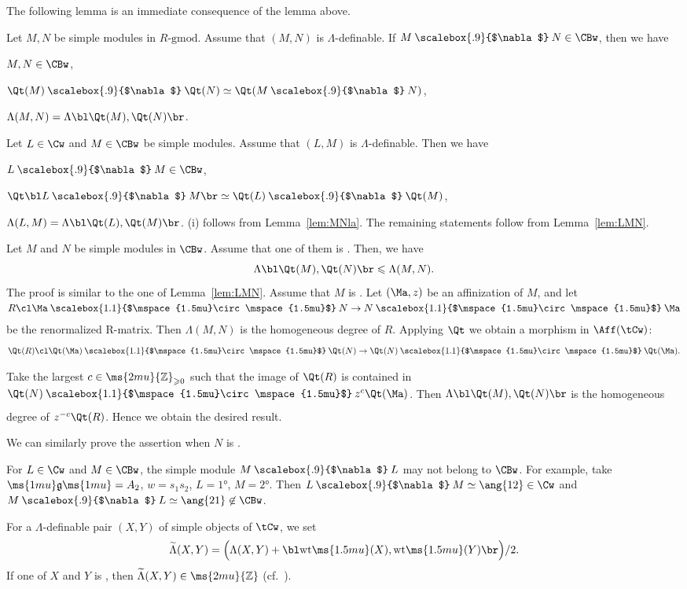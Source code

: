 \documentclass[12pt,leqno]{amsart}%
\renewcommand{\le}{\leqslant}
\renewcommand{\ge}{\geqslant}
\theoremstyle{plain}
\theoremstyle{definition}
\newcommand{\Z}{\ms{2mu}{\mathbb Z}}
\newcommand{\g}{\ms{1mu}\mathfrak{g}\ms{1mu}}
\newcommand{\gmod}{\text{-}\mathrm{gmod}}
\newcommand{\conv}[1][]{
\underset{\raisebox{.5ex}{$\scriptstyle{#1}$}}{\mathbin{\scalebox{1.1}{$\mspace{1.5mu}\circ\mspace{1.5mu}$}}}}
\newcommand{\hconv}{\mathbin{\scalebox{.9}{$\nabla$}}}
\newcommand{\wt}{\mathrm{wt}\ms{1.5mu}} 		%
\newcommand{\La}{\Lambda} 			%
\newcommand{\tLa}{\widetilde{\Lambda}} 			%
\newcommand{\bnum}{\be[{\rm(i)}]}
\numberwithin{equation}{section}
\begin{document}
The following lemma is an immediate consequence of the lemma above.

\Lemma\label{lem:LMN}
Let $M,N$ be simple modules in $R\gmod$. Assume that $(M,N)$ is $\La$-definable.
If $M\hconv N\in\CBw$, then we have
\bnum
\item $M,N\in\CBw$,
\item$\Qt(M)\hconv\Qt(N)\simeq \Qt(M\hconv N)$,
\item
$\La(M,N)=\La\bl\Qt(M),\Qt(N)\br$.
\ee
\enlemma

%
\Prop\label{prop:CB}
Let $L\in\Cw$ and $M\in\CBw$ be simple modules.
Assume that  $(L,M)$ is $\La$-definable.
Then we have
\bnum
\item $L\hconv M\in\CBw$,
\item $\Qt\bl L\hconv M\br \simeq \Qt(L)\hconv \Qt(M)$,
\item $\La(L,M)=\La\bl \Qt(L), \Qt(M)\br$.
\ee
\enprop
\Proof
(i) follows from Lemma~\ref{lem:MNla}.
The remaining statements follow from Lemma~\ref{lem:LMN}.
\QED

\Lemma\label{lem:LaQt}
Let $M$ and $N$ be simple modules in $\CBw$.
Assume that one of them is \afr. Then, we have
$$\La\bl\Qt(M),\Qt(N)\br\le\La(M,N).$$
\enlemma
\Proof
The proof is similar to the one of Lemma~\ref{lem:LMN}.
Assume that $M$ is \afr.
Let $(\Ma,z)$ be an affinization of $M$, and let
$R\cl \Ma\conv N\to N\conv \Ma$
be the renormalized R-matrix.
Then $\La(M,N)$ is the homogeneous degree of $R$.
Applying $\Qt$ we obtain a morphism in $\Aff(\tCw)$:
$$\Qt(R)\cl \Qt(\Ma)\conv \Qt(N)\to \Qt(N)\conv \Qt(\Ma).$$
Take the largest $c\in\Z_{\ge0}$ such that
the image of $\Qt(R)$ is contained in $\Qt(N)\conv z^c\Qt(\Ma)$.
Then $\La\bl\Qt(M),\Qt(N)\br$ is the homogeneous degree of $z^{-c}\Qt(R)$.
Hence we obtain the desired result.

We can similarly prove the assertion when $N$ is \afr.
\QED

\Rem\label{rem:12}
For \afr $L\in\Cw$ and $M\in\CBw$, the simple module $M\hconv L$ may not belong to $\CBw$.
For example, take $\g=A_2$, $w=s_1s_2$,
$L=\ang{1}$, $M=\ang{2}$.
Then $L\hconv M\simeq\ang{12}\in\Cw$ and
$M\hconv L\simeq\ang{21}\not\in\CBw$.
\enrem


\smallskip
For a $\La$-definable pair  $(X,Y)$ of simple objects of $\tCw$,
 we set
\[
\tLa(X,Y)=\Bigl(\La(X,Y)+\bl\wt(X),\wt(Y)\br\Bigr)/2.
\]
If one of $X$ and $Y$ is \afr, then $\tLa(X,Y)\in\Z$ (cf.\ \cite[Lemma~3.11]{KKOP21}). 
\end{document}
